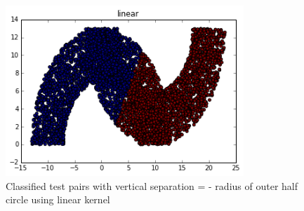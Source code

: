 \documentclass[paper=a4, fontsize=11pt]{scrartcl} %
\numberwithin{equation}{section} %
\numberwithin{figure}{section} %
\numberwithin{table}{section} %
\begin{document}
\begin{figure}[H]
	\centering
  \includegraphics[width=0.8\textwidth]{linear_4.png}
	\caption{Classified test pairs with vertical separation = - radius of outer half circle using linear kernel}
	\label{fig_l4}
\end{figure}
\end{document}
